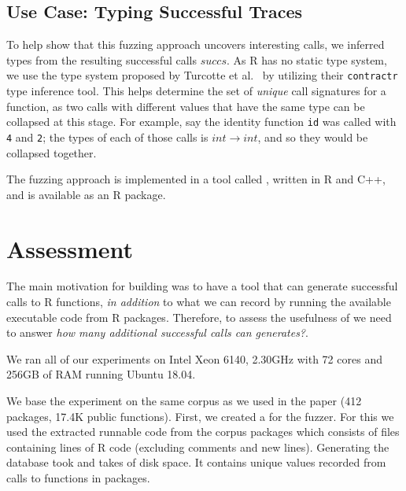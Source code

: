 \documentclass[sigplan,anonymous,review]{acmart}
\begin{document}


\subsection{Use Case: Typing Successful Traces}

To help show that this fuzzing approach uncovers interesting calls, we inferred types from the resulting successful calls $succs$.
As R has no static type system, we use the type system proposed by Turcotte et al.~\cite{turcotte2020designing} by utilizing their {\tt contractr} type inference tool.
This helps determine the set of \textit{unique} call signatures for a function, as two calls with different values that have the same type can be collapsed at this stage.
For example, say the identity function {\tt id} was called with {\tt 4} and {\tt 2}; the types of each of those calls is $int \rightarrow int$, and so they would be collapsed together. 

The fuzzing approach is implemented in a tool called \tool, written in R and C++, and is available as an R package.

\section{Assessment}
\label{sec:assessment}

The main motivation for building \tool was to have a tool that can generate successful calls to R functions, \emph{in addition} to what we can record by running the available executable code from R packages.
Therefore, to assess the usefulness of \tool we need to answer \emph{how many additional successful calls can \tool generates?}.

We ran all of our experiments on Intel Xeon 6140, 2.30GHz with 72 cores and 256GB of RAM running Ubuntu 18.04.

We base the experiment on the same corpus as we used in the \typer paper (412 packages, 17.4K public functions).
First, we created a \sxpdb for the fuzzer.
For this we used the extracted runnable code from the corpus packages which consists of \DBNumSourceFiles files containing \DBSourceLinesOfCodeRnd lines of R code (excluding comments and new lines).
Generating the database took  and takes \DBFileSize of disk space.
It contains \DBValuesRnd unique values recorded from \DBNumCallsRnd calls to \DBNumFunctionsRnd functions in \DBNumPackages packages.
\end{document}
